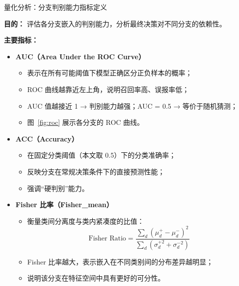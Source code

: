 \documentclass[aspectratio=169]{beamer}
\begin{document}
\begin{frame}{量化分析：分支判别能力指标定义}

\textbf{目的：}  
评估各分支嵌入的判别能力，分析最终决策对不同分支的依赖性。

\vspace{0.6em}
\textbf{主要指标：}

\begin{itemize}
  \item \textbf{AUC（Area Under the ROC Curve）}
  \begin{itemize}
    \item 表示在所有可能阈值下模型正确区分正负样本的概率；
    \item ROC 曲线越靠近左上角，说明召回率高、误报率低；
    \item AUC 值越接近 1 → 判别能力越强；AUC = 0.5 → 等价于随机猜测；
    \item 图~\ref{fig:roc} 展示各分支的 ROC 曲线。
  \end{itemize}

  \vspace{0.4em}
  \item \textbf{ACC（Accuracy）}
  \begin{itemize}
    \item 在固定分类阈值（本文取 0.5）下的分类准确率；
    \item 反映分支在常规决策条件下的直接预测性能；
    \item 强调“硬判别”能力。
  \end{itemize}

  \vspace{0.4em}
  \item \textbf{Fisher 比率（Fisher\_mean）}
  \begin{itemize}
    \item 衡量类间分离度与类内紧凑度的比值：
      \[
      \text{Fisher Ratio} =
      \frac{\sum_d (\mu_d^{+} - \mu_d^{-})^2}
           {\sum_d (\sigma_d^{+2} + \sigma_d^{-2})}
      \]
    \item Fisher 比率越大，表示嵌入在不同类别间的分布差异越明显；
    \item 说明该分支在特征空间中具有更好的可分性。
  \end{itemize}
\end{itemize}

\end{frame}
\end{document}
